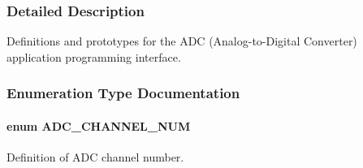 \subsubsection{Detailed Description}
Definitions and prototypes for the A\+DC (Analog-\/to-\/\+Digital Converter) application programming interface. 



\subsubsection{Enumeration Type Documentation}
\paragraph[{\texorpdfstring{A\+D\+C\+\_\+\+C\+H\+A\+N\+N\+E\+L\+\_\+\+N\+UM}{ADC_CHANNEL_NUM}}]{\setlength{\rightskip}{0pt plus 5cm}enum {\bf A\+D\+C\+\_\+\+C\+H\+A\+N\+N\+E\+L\+\_\+\+N\+UM}}\hypertarget{group___a_d_c_gae2979f990d12a677030fc13a4079cbc5}{}\label{group___a_d_c_gae2979f990d12a677030fc13a4079cbc5}


Definition of A\+DC channel number. 

